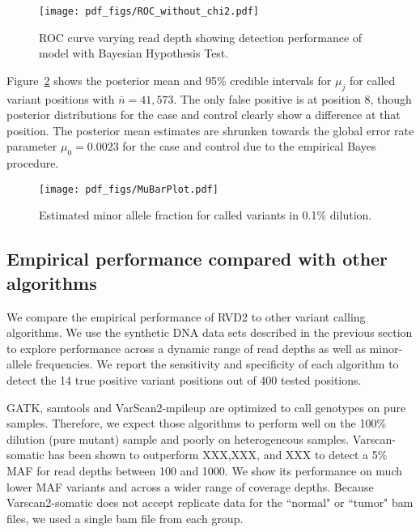\documentclass[11pt,reqno]{amsart}
\begin{document}
\begin{figure}[htbp]
\begin{center}
\texttt{[image: pdf\_figs/ROC\_without\_chi2.pdf]}
\caption{ROC curve varying read depth showing detection performance of model with Bayesian Hypothesis Test.}
\label{fig:ROC}
\end{center}
\end{figure}

Figure~\ref{fig:MAF} shows the posterior mean and 95\% credible intervals for $\mu_j$ for called variant positions with $\bar{n} = 41,573$. The only false positive is at position 8, though posterior distributions for the case and control clearly show a difference at that position. The posterior mean estimates are shrunken towards the global error rate parameter $\mu_0 = 0.0023$ for the case and control due to the empirical Bayes procedure.

\begin{figure}[h]
\begin{center}
\texttt{[image: pdf\_figs/MuBarPlot.pdf]}
\caption{Estimated minor allele fraction for called variants in 0.1\% dilution.}
\label{fig:MAF}
\end{center}
\end{figure}


\subsection{Empirical performance compared with other algorithms}

We compare the empirical performance of RVD2 to other variant calling algorithms. We use the synthetic DNA data sets described in the previous section to explore performance across a dynamic range of read depths as well as minor-allele frequencies. We report the sensitivity and specificity of each algorithm to detect the 14 true positive variant positions out of 400 tested positions.

GATK, samtools and VarScan2-mpileup are optimized to call genotypes on pure samples. Therefore, we expect those algorithms to perform well on the 100\% dilution (pure mutant) sample and poorly on heterogeneous samples. Varscan-somatic has been shown to outperform XXX,XXX, and XXX to detect a 5\% MAF for read depths between 100 and 1000. We show its performance on much lower MAF variants and across a wider range of coverage depths. Because Varscan2-somatic does not accept replicate data for the ``normal" or ``tumor" bam files, we used a single bam file from each group.
\end{document}

